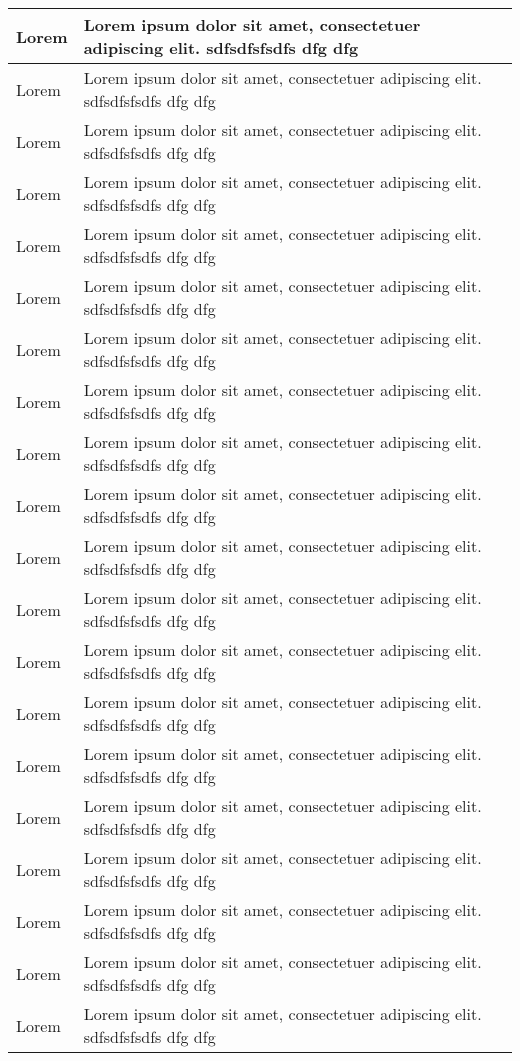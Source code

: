 \begin{longtable}{|>{\small\setlength\hsize{.5\hsize}}X|>{\small\setlength\hsize{1.5\hsize}}X|}
Lorem & Lorem ipsum dolor sit amet, consectetuer adipiscing elit. sdfsdfsfsdfs dfg dfg\\\hline
Lorem & Lorem ipsum dolor sit amet, consectetuer adipiscing elit. sdfsdfsfsdfs dfg dfg\\\hline
Lorem & Lorem ipsum dolor sit amet, consectetuer adipiscing elit. sdfsdfsfsdfs dfg dfg\\\hline
Lorem & Lorem ipsum dolor sit amet, consectetuer adipiscing elit. sdfsdfsfsdfs dfg dfg\\\hline
Lorem & Lorem ipsum dolor sit amet, consectetuer adipiscing elit. sdfsdfsfsdfs dfg dfg\\\hline
Lorem & Lorem ipsum dolor sit amet, consectetuer adipiscing elit. sdfsdfsfsdfs dfg dfg\\\hline
Lorem & Lorem ipsum dolor sit amet, consectetuer adipiscing elit. sdfsdfsfsdfs dfg dfg\\\hline
Lorem & Lorem ipsum dolor sit amet, consectetuer adipiscing elit. sdfsdfsfsdfs dfg dfg\\\hline
Lorem & Lorem ipsum dolor sit amet, consectetuer adipiscing elit. sdfsdfsfsdfs dfg dfg\\\hline
Lorem & Lorem ipsum dolor sit amet, consectetuer adipiscing elit. sdfsdfsfsdfs dfg dfg\\\hline
Lorem & Lorem ipsum dolor sit amet, consectetuer adipiscing elit. sdfsdfsfsdfs dfg dfg\\\hline
Lorem & Lorem ipsum dolor sit amet, consectetuer adipiscing elit. sdfsdfsfsdfs dfg dfg\\\hline
Lorem & Lorem ipsum dolor sit amet, consectetuer adipiscing elit. sdfsdfsfsdfs dfg dfg\\\hline
Lorem & Lorem ipsum dolor sit amet, consectetuer adipiscing elit. sdfsdfsfsdfs dfg dfg\\\hline
Lorem & Lorem ipsum dolor sit amet, consectetuer adipiscing elit. sdfsdfsfsdfs dfg dfg\\\hline
Lorem & Lorem ipsum dolor sit amet, consectetuer adipiscing elit. sdfsdfsfsdfs dfg dfg\\\hline
Lorem & Lorem ipsum dolor sit amet, consectetuer adipiscing elit. sdfsdfsfsdfs dfg dfg\\\hline
Lorem & Lorem ipsum dolor sit amet, consectetuer adipiscing elit. sdfsdfsfsdfs dfg dfg\\\hline
Lorem & Lorem ipsum dolor sit amet, consectetuer adipiscing elit. sdfsdfsfsdfs dfg dfg\\\hline
Lorem & Lorem ipsum dolor sit amet, consectetuer adipiscing elit. sdfsdfsfsdfs dfg dfg\\\hline

\end{longtable}
